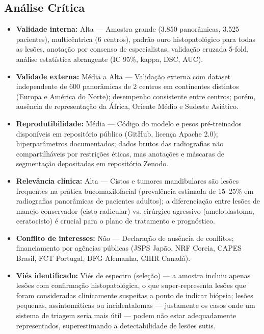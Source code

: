 \subsection{Análise Crítica}
\begin{itemize}
  \item \textbf{Validade interna:} Alta --- Amostra grande (3.850
        panorâmicas, 3.525 pacientes), multicêntrica (6 centros),
        padrão ouro histopatológico para todas as lesões, anotação
        por consenso de especialistas, validação cruzada 5-fold,
        análise estatística abrangente (IC 95\%, kappa, DSC, AUC).
  \item \textbf{Validade externa:} Média a Alta --- Validação externa
        com dataset independente de 600 panorâmicas de 2 centros
        em continentes distintos (Europa e América do Norte);
        desempenho consistente entre centros; porém, ausência de
        representação da África, Oriente Médio e Sudeste Asiático.
  \item \textbf{Reprodutibilidade:} Média --- Código do modelo e
        pesos pré-treinados disponíveis em repositório público
        (GitHub, licença Apache 2.0); hiperparâmetros documentados;
        dados brutos das radiografias não compartilháveis por
        restrições éticas, mas anotações e máscaras de segmentação
        depositadas em repositório Zenodo.
  \item \textbf{Relevância clínica:} Alta --- Cistos e tumores
        mandibulares são lesões frequentes na prática bucomaxilofacial
        (prevalência estimada de 15--25\% em radiografias panorâmicas
        de pacientes adultos); a diferenciação entre lesões de
        manejo conservador (cisto radicular) vs. cirúrgico agressivo
        (ameloblastoma, ceratocisto) é crucial para o plano de
        tratamento e prognóstico.
  \item \textbf{Conflito de interesses:} Não --- Declaração de ausência
        de conflitos; financiamento por agências públicas (JSPS
        Japão, NRF Coreia, CAPES Brasil, FCT Portugal, DFG Alemanha,
        CIHR Canadá).
  \item \textbf{Viés identificado:} Viés de espectro (seleção) ---
        a amostra incluiu apenas lesões com confirmação
        histopatológica, o que super-representa lesões que foram
        consideradas clinicamente suspeitas a ponto de indicar
        biópsia; lesões pequenas, assintomáticas ou incidentalomas
        --- justamente os casos onde um sistema de triagem seria
        mais útil --- podem não estar adequadamente representados,
        superestimando a detectabilidade de lesões sutis.
\end{itemize}

